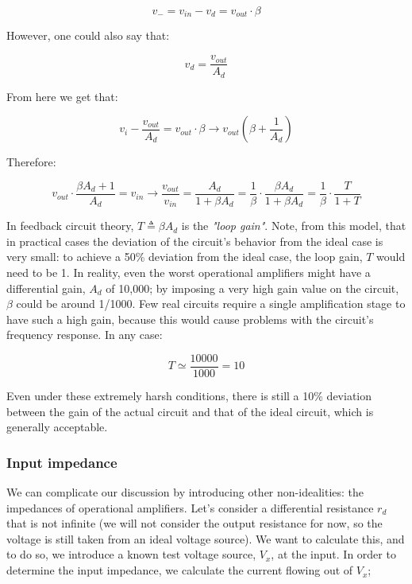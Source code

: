 \documentclass[../main.tex]{subfiles}
\begin{document}
\begin{equation}
	v_- = v_{in} - v_d = v_{out} \cdot \beta
\end{equation}

However, one could also say that:

\begin{equation}
	v_d = \frac{v_{out}}{A_d}
\end{equation}

From here we get that:

\begin{equation}
	v_i - \frac{v_{out}}{A_d} = v_{out} \cdot \beta \rightarrow v_{out} \left( \beta + \frac{1}{A_d} \right)
\end{equation}

Therefore:

\begin{equation}
	v_{out} \cdot \frac{\beta A_d + 1}{A_d} = v_{in} \rightarrow \frac{v_{out}}{v_{in}} = \frac{A_d}{1 + \beta A_d} = \frac{1}{\beta} \cdot \frac{\beta A_d}{1 + \beta A_d} = \frac{1}{\beta} \cdot \frac{T}{1 + T}
\end{equation}


In feedback circuit theory, $T \triangleq \beta A_d $ is the \textit{"loop gain"}. Note, from this model, that in practical cases the deviation of the circuit’s behavior from the ideal case is very small: to achieve a 50\% deviation from the ideal case, the loop gain, $T$ would need to be 1. In reality, even the worst operational amplifiers might have a differential gain, $A_d$ of 10,000; by imposing a very high gain value on the circuit, $\beta$ could be around 1/1000. Few real circuits require a single amplification stage to have such a high gain, because this would cause problems with the circuit’s frequency response. In any case:

\begin{equation}
	T \simeq \frac{10000}{1000} = 10
\end{equation}

Even under these extremely harsh conditions, there is still a 10\% deviation between the gain of the actual circuit and that of the ideal circuit, which is generally acceptable.

\subsubsection*{Input impedance}

We can complicate our discussion by introducing other non-idealities: the impedances of operational amplifiers. Let’s consider a differential resistance $r_d$ that is not infinite (we will not consider the output resistance for now, so the voltage is still taken from an ideal voltage source). We want to calculate this, and to do so, we introduce a known test voltage source, $V_x$, at the input. In order to determine the input impedance, we calculate the current flowing out of $V_x$;
\end{document}
